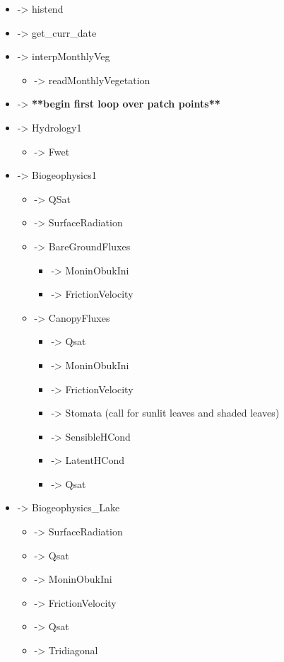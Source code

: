 \documentclass[]{article}
\begin{document}
\begin{itemize}
\item ->  histend 
\item ->  get\_curr\_date 
\item ->  interpMonthlyVeg 
  \begin{itemize}
  \item ->  readMonthlyVegetation 
  \end{itemize}
\item -> {\bf ***begin first loop over patch points**} 
\item ->  Hydrology1 
  \begin{itemize}
  \item ->  Fwet 
  \end{itemize}
\item ->  Biogeophysics1 
  \begin{itemize}
  \item ->  QSat 
  \item ->  SurfaceRadiation 
  \item ->  BareGroundFluxes 
    \begin{itemize}
    \item ->  MoninObukIni 
    \item ->  FrictionVelocity 
    \end{itemize}
  \item ->  CanopyFluxes 
     \begin{itemize}
     \item ->  Qsat 
     \item ->  MoninObukIni 
     \item ->  FrictionVelocity 
     \item ->  Stomata (call for sunlit leaves and shaded leaves) 
     \item ->  SensibleHCond 
     \item ->  LatentHCond 
     \item ->  Qsat 
     \end{itemize}
  \end{itemize}
\item ->  Biogeophysics\_Lake 
  \begin{itemize}
  \item ->  SurfaceRadiation 
  \item ->  Qsat 
  \item ->  MoninObukIni 
  \item ->  FrictionVelocity 
  \item ->  Qsat 
  \item ->  Tridiagonal 

\end{itemize}
\end{itemize}
\end{document}

